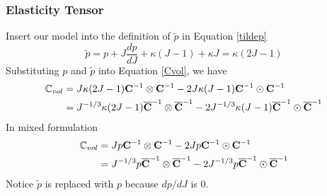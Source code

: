 %
\subsubsection{Elasticity Tensor}
Insert our model into the definition of $\tilde{p}$ in Equation \ref{tildep}
\begin{equation}
\tilde{p} = p + J\frac{dp}{dJ} + \kappa(J-1) + \kappa{J} = \kappa{(2J - 1)}
\end{equation}
Substituting $p$ and $\tilde{p}$ into Equation \ref{Cvol}, we have
\begin{equation}
\begin{split}
\mathbb{C}_{vol} &= J\kappa{(2J-1)} \bold{C}^{-1} \otimes \bold{C}^{-1} - 2J\kappa{(J-1)} \bold{C}^{-1} \odot \bold{C}^{-1}  \\
&= J^{-1/3}\kappa{(2J-1)} \overline{\bold{C}}^{-1} \otimes \overline{\bold{C}}^{-1} - 2J^{-1/3}\kappa{(J-1)} \overline{\bold{C}}^{-1} \odot \overline{\bold{C}}^{-1}
\end{split}
\end{equation}
In mixed formulation
\begin{equation} \label{mCvol}
\begin{split}
\mathbb{C}_{vol} &= Jp\bold{C}^{-1}\otimes\bold{C}^{-1} - 2Jp\bold{C}^{-1}\odot\bold{C}^{-1} \\
&= J^{-1/3}p\overline{\bold{C}}^{-1}\otimes\overline{\bold{C}}^{-1} - 2J^{-1/3}p\overline{\bold{C}}^{-1}\odot\overline{\bold{C}}^{-1}
\end{split}
\end{equation}
Notice $\tilde{p}$ is replaced with $p$ because ${dp}/{dJ}$ is $0$.

